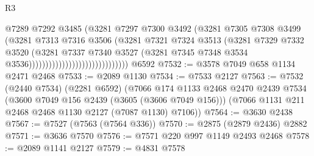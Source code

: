 \begin{lexlean}{R3}
\begin{coremodule}
                                                  @7289
                                                  @7292
                                                  @3485
                                                  (@3281
                                                    @7297
                                                    @7300
                                                    @3492
                                                    (@3281
                                                      @7305
                                                      @7308
                                                      @3499
                                                      (@3281
                                                        @7313
                                                        @7316
                                                        @3506
                                                        (@3281
                                                          @7321
                                                          @7324
                                                          @3513
                                                          (@3281
                                                            @7329
                                                            @7332
                                                            @3520
                                                            (@3281
                                                              @7337
                                                              @7340
                                                              @3527
                                                              (@3281
                                                                @7345
                                                                @7348
                                                                @3534
                                                                @3536))))))))))))))))))))))))))))))
    @6592
@7532 := @3578 @7049 @658 @1134 @2471 @2468
@7533 := @2089 @1130
@7534 := @7533 @2127
@7563 := @7532
    (@2440 @7534)
    (@2281 @6592)
    (@7066
      @174
      @1133
      @2468
      @2470
      @2439
      @7534
      (@3600 @7049 @156 @2439 (@3605 (@3606 @7049 @156)))
      (@7066 @1131 @211 @2468 @2468 @1130 @2127 (@7087 @1130) @7106))
@7564 := @3630 @2438
@7567 := @7527 (@7563 (@7564 @336))
@7570 := @2875 (@2879 @2436) @2882
@7571 := @3636 @7570
@7576 := @7571 @220 @997 @1149 @2493 @2468
@7578 := @2089 @1141 @2127
@7579 := @4831 @7578

\end{coremodule}
\end{lexlean}
